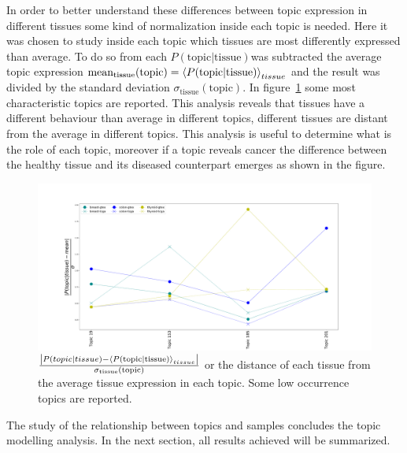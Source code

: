 In order to better understand these differences between topic expression in different tissues some kind of normalization inside each topic is needed. Here it was chosen to study inside each topic which tissues are most differently expressed than average. To do so from each $P(\text{topic}| \text{tissue})$was subtracted the average topic expression $\text{mean}_{\text{tissue}}(\text{topic})=\left\langle P(\text{topic}| \text{tissue})\right\rangle_{tissue}$ and the result was divided by the standard deviation $\sigma_{\text{tissue}}(\text{topic})$. In figure~\ref{fig:topic/merged/lifeplot_normalised_level3_hd} some most characteristic topics are reported. This analysis reveals that tissues have a different behaviour than average in different topics, different tissues are distant from the average in different topics. This 
analysis is useful to determine what is the role of each topic, moreover if a topic reveals cancer the difference between the healthy tissue and its diseased counterpart emerges as shown in the figure.
\begin{figure}[htb!]
	\centering
	\includegraphics[width=0.85\linewidth]{pictures/topic/merged/lifeplot_normalised_level3_hd.pdf}
	\caption{$\frac{\left|P(topic | tissue) - \left\langle P(\text{topic}| \text{tissue})\right\rangle_{tissue}\right|}{\sigma_{\text{tissue}}(\text{topic})}$ or the distance of each tissue from the average tissue expression in each topic. Some low occurrence topics are reported.}
	\label{fig:topic/merged/lifeplot_normalised_level3_hd}
\end{figure}

The study of the relationship between topics and samples concludes the topic modelling analysis. In the next section, all results achieved will be summarized.